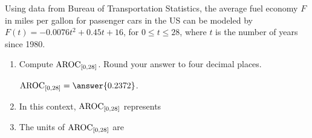\documentclass{ximera}
\author{Kenneth Berglund}
\begin{document}
\licenseSZ
\begin{exercise}

Using data from Bureau of Transportation Statistics, the average fuel economy $F$ in miles per gallon for passenger cars in the US can be modeled by $F(t) = -0.0076t^2 + 0.45t + 16$, for $0 \le t \le 28$, where $t$ is the number of years since 1980.

\begin{enumerate}

\item Compute $\mathrm{AROC}_{[0, 28]}$.  Round your answer to four decimal places.

$\av_{[0, 28]} = \answer{0.2372}$\calcHW.

\item In this context, $\mathrm{AROC}_{[0, 28]}$ represents
\begin{multipleChoice}
\end{multipleChoice}

\item The units of $\mathrm{AROC}_{[0, 28]}$ are
\begin{multipleChoice}
\end{multipleChoice}
\end{enumerate}



\end{exercise}
\end{document}

